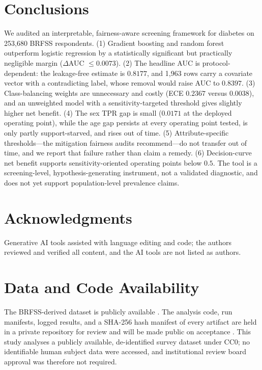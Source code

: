 \documentclass[conference]{IEEEtran}
\begin{document}
\section{Conclusions}
We audited an interpretable, fairness-aware screening framework for diabetes on 253{,}680 BRFSS respondents. (1) Gradient boosting and random forest outperform logistic regression by a statistically significant but practically negligible margin ($\Delta$AUC $\le 0.0073$). (2) The headline AUC is protocol-dependent: the leakage-free estimate is $0.8177$, and 1{,}963 rows carry a covariate vector with a contradicting label, whose removal would raise AUC to $0.8397$. (3) Class-balancing weights are unnecessary and costly (ECE $0.2367$ versus $0.0038$), and an unweighted model with a sensitivity-targeted threshold gives slightly higher net benefit. (4) The sex TPR gap is small ($0.0171$ at the deployed operating point), while the age gap persists at every operating point tested, is only partly support-starved, and rises out of time. (5) Attribute-specific thresholds---the mitigation fairness audits recommend---do not transfer out of time, and we report that failure rather than claim a remedy. (6) Decision-curve net benefit supports sensitivity-oriented operating points below $0.5$. The tool is a screening-level, hypothesis-generating instrument, not a validated diagnostic, and does not yet support population-level prevalence claims.

\section*{Acknowledgments}
Generative AI tools assisted with language editing and code; the authors reviewed and verified all content, and the AI tools are not listed as authors.

\section*{Data and Code Availability}
The BRFSS-derived dataset is publicly available \cite{cdc2017}. The analysis code, run manifests, logged results, and a SHA-256 hash manifest of every artifact are held in a private repository for review and will be made public on acceptance \cite{repo}. This study analyses a publicly available, de-identified survey dataset under CC0; no identifiable human subject data were accessed, and institutional review board approval was therefore not required.
\end{document}
